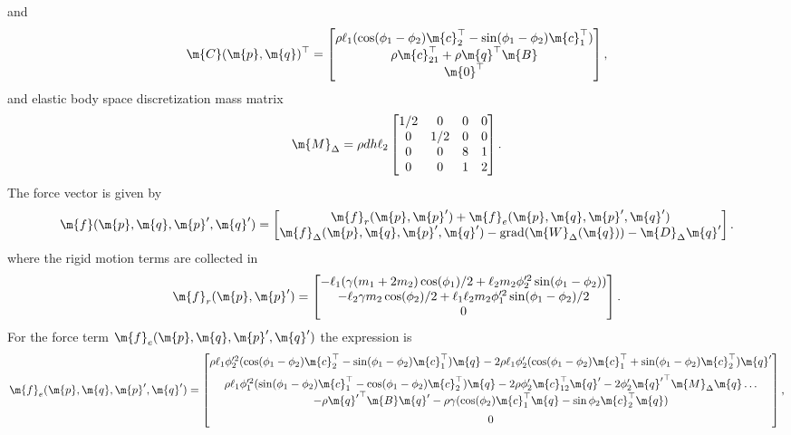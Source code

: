 %
and
%
\begin{equation*}
  \m{C}(\m{p}, \m{q})^\top = \begin{bmatrix}
    \rho \ell_1(\cos(\phi_1 - \phi_2)\m{c}_2^\top - \sin(\phi_1 - \phi_2)\m{c}_1^\top) \\
    \rho\m{c}_{21}^\top + \rho\m{q}^\top\m{B} \\
    \m{0}^\top
  \end{bmatrix} \text{,}
\end{equation*}
%
and elastic body space discretization mass matrix
%
\begin{equation*}
  \m{M}_{\Delta} = \rho d h \ell_2 \begin{bmatrix}
    1/2 & 0   & 0 & 0 \\
    0   & 1/2 & 0 & 0 \\
    0   & 0   & 8 & 1 \\
    0   & 0   & 1 & 2
  \end{bmatrix} \text{.}
\end{equation*}
%
The force vector is given by
%
\begin{equation}
  \m{f}(\m{p}, \m{q}, \m{p}^\prime, \m{q}^\prime) = \begin{bmatrix}
    \m{f}_r(\m{p}, \m{p}^\prime) + \m{f}_e(\m{p}, \m{q}, \m{p}^\prime, \m{q}^\prime) \\
    \m{f}_{\Delta}(\m{p}, \m{q}, \m{p}^\prime, \m{q}^\prime) - \mathrm{grad}(\m{W}_{\Delta}(\m{q})) - \m{D}_{\Delta} \m{q}^\prime
  \end{bmatrix} \text{.}
\end{equation}
%
where the rigid motion terms are collected in
%
\begin{equation*}
  \m{f}_r(\m{p}, \m{p}^\prime) = \begin{bmatrix}
    -\ell_1(\gamma(m_1 + 2m_2) \cos(\phi_1)/2 + \ell_2 m_2 \phi_2^{\prime2} \sin(\phi_1 - \phi_2)) \\
    -\ell_2 \gamma m_2 \cos(\phi_2)/2 + \ell_1 \ell_2 m_2 \phi_1^{\prime2} \sin(\phi_1 - \phi_2)/2 \\
    0
  \end{bmatrix} \text{.}
\end{equation*}
%
For the force term $\m{f}_e(\m{p}, \m{q}, \m{p}^\prime, \m{q}^\prime)$ the expression is
%
\begin{equation*}
  \m{f}_e(\m{p}, \m{q}, \m{p}^\prime, \m{q}^\prime) = \begin{bmatrix}
    \rho \ell_1 \phi_2^{\prime2}(\cos(\phi_1 - \phi_2)\m{c}_2^\top - \sin(\phi_1 - \phi_2)\m{c}_1^\top) \m{q}-2 \rho \ell_1 \phi_2^\prime(\cos(\phi_1 - \phi_2)\m{c}_1^\top + \sin(\phi_1 - \phi_2)\m{c}_2^\top) \m{q}^\prime \\[0.5em]
    \rho \ell_1 \phi_1^{\prime2}(\sin(\phi_1 - \phi_2)\m{c}_1^\top - \cos(\phi_1 - \phi_2)\m{c}_2^\top) \m{q}-2 \rho \phi_2^\prime \m{c}_{12}^\top \m{q}^\prime-2 \phi_2^\prime {\m{q}^\prime}^\top \m{M}_{\Delta} \m{q} \dots\\
    -\rho {\m{q}^\prime}^\top \m{B} \m{q}^\prime - \rho \gamma(\cos(\phi_2) \m{c}_1^\top \m{q} - \sin \phi_2 \m{c}_2^\top \m{q}) \\[0.5em]
    0
\end{bmatrix} \text{,}
\end{equation*}
